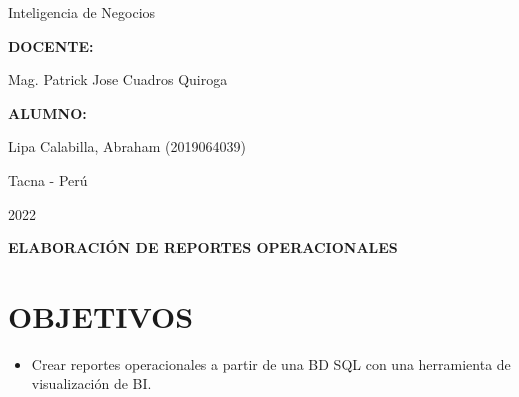 \documentclass[12pt,letterpaper]{article}
\begin{document}
\begin{titlepage}
\begin{center}
\begin{large}
                Inteligencia de Negocios\\
            \end{large}
            \vspace*{0.2in}
            \begin{Large}
                \textbf{DOCENTE:} \\
            \end{Large}
            \vspace*{0.1in}
            \begin{large}
                Mag. Patrick Jose Cuadros Quiroga\\
            \end{large}
            \vspace*{0.3in}
            \begin{large}
                \textbf{ALUMNO:} \\
                \begin{flushleft}
                    Lipa Calabilla, Abraham  		\hfill	(2019064039) \\
                \end{flushleft}
            \end{large}
            \vspace*{1.3in}
            \begin{large}
                Tacna - Perú\\
            \end{large}
            \vspace*{0.1in}
            \begin{large}
                2022\\
            \end{large}
        \end{center}
    \end{titlepage}
    
    \newpage
    \tableofcontents
    \justify
    \newpage
    \begin{LARGE}
        \begin{center}
            \textbf{ELABORACIÓN DE REPORTES OPERACIONALES} \\
        \end{center}
    \end{LARGE}
    \section{OBJETIVOS}
    \begin{itemize}
        \item Crear reportes operacionales a partir de una BD SQL con una herramienta de visualización de BI.
    \end{itemize}
\end{document}
